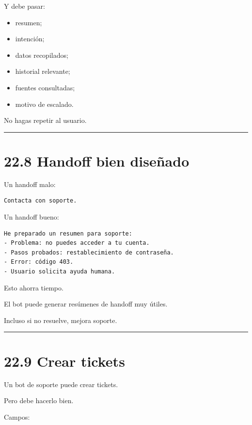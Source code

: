 Y debe pasar:

\begin{itemize}
\tightlist
\item
  resumen;
\item
  intención;
\item
  datos recopilados;
\item
  historial relevante;
\item
  fuentes consultadas;
\item
  motivo de escalado.
\end{itemize}

No hagas repetir al usuario.

\begin{center}\rule{0.5\linewidth}{0.5pt}\end{center}

\section{22.8 Handoff bien diseñado}\label{handoff-bien-diseuxf1ado}

Un handoff malo:

\begin{lstlisting}
Contacta con soporte.
\end{lstlisting}

Un handoff bueno:

\begin{lstlisting}
He preparado un resumen para soporte:
- Problema: no puedes acceder a tu cuenta.
- Pasos probados: restablecimiento de contraseña.
- Error: código 403.
- Usuario solicita ayuda humana.
\end{lstlisting}

Esto ahorra tiempo.

El bot puede generar resúmenes de handoff muy útiles.

Incluso si no resuelve, mejora soporte.

\begin{center}\rule{0.5\linewidth}{0.5pt}\end{center}

\section{22.9 Crear tickets}\label{crear-tickets}

Un bot de soporte puede crear tickets.

Pero debe hacerlo bien.

Campos:

